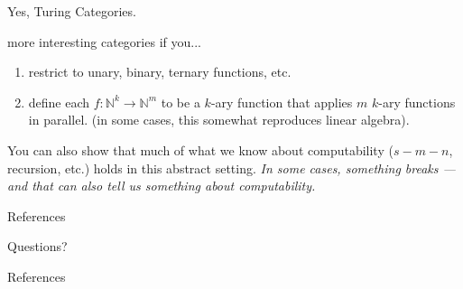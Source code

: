 \documentclass[10pt]{beamer}
\newcommand{\themename}{\textbf{\textsc{metropolis}}\xspace}
\DeclareRobustCommand{\step}{\bigskip\noindent}
\newcommand\N{\mathbb{N}}
\begin{document}
\begin{frame}[fragile]{Yes, Turing Categories.}

  more interesting categories if you...
  
  \begin{enumerate}
    \item restrict to unary, binary, ternary functions, etc.
    \item define each $f : \N^k \to \N^m$ to be a $k$-ary function
      that applies $m$ $k$-ary functions in parallel.
      (\alert{in some cases, this somewhat reproduces linear algebra}).
  \end{enumerate}

  \step
  You can also show that much of what we know about computability
  ($s-m-n$, recursion, etc.) holds in this abstract setting.
  \emph{
    In some cases, something breaks --- and that can also tell us
    something about computability.
  }

  References
  ~\cite{APPLICATIVE-STRUCTURES,BRADLEY,TURING-CATEGORIES,CATEGORY-THEORY-TEXT}

\end{frame}

{
\begin{frame}[standout]
  Questions?
\end{frame}
}

\appendix




\begin{frame}[allowframebreaks]{References}

  
  

\end{frame}
\end{document}
